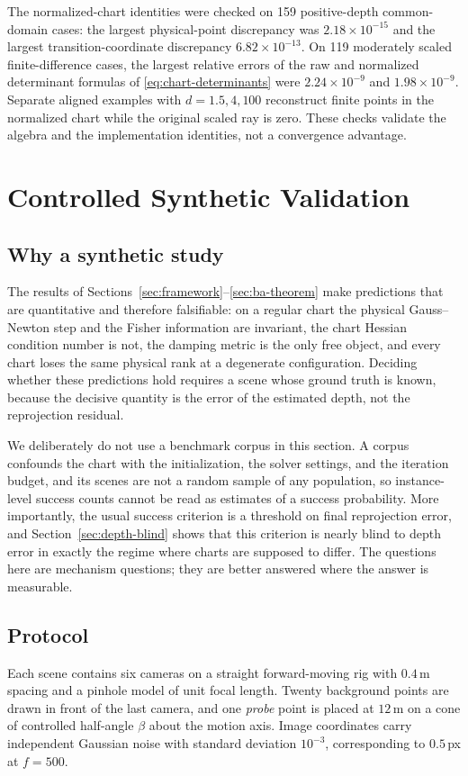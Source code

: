 \documentclass[11pt,a4paper]{article}
\theoremstyle{definition}
\theoremstyle{remark}
\begin{document}
The normalized-chart identities were checked on 159 positive-depth common-domain cases: the largest physical-point discrepancy was $2.18\times10^{-15}$ and the largest transition-coordinate discrepancy $6.82\times10^{-13}$. On 119 moderately scaled finite-difference cases, the largest relative errors of the raw and normalized determinant formulas of \eqref{eq:chart-determinants} were $2.24\times10^{-9}$ and $1.98\times10^{-9}$. Separate aligned examples with $d=1.5,4,100$ reconstruct finite points in the normalized chart while the original scaled ray is zero. These checks validate the algebra and the implementation identities, not a convergence advantage.

\section{Controlled Synthetic Validation}
\label{sec:synthetic}

\subsection{Why a synthetic study}
The results of Sections~\ref{sec:framework}--\ref{sec:ba-theorem} make predictions that are quantitative and therefore falsifiable: on a regular chart the physical Gauss--Newton step and the Fisher information are invariant, the chart Hessian condition number is not, the damping metric is the only free object, and every chart loses the same physical rank at a degenerate configuration. Deciding whether these predictions hold requires a scene whose ground truth is known, because the decisive quantity is the error of the estimated depth, not the reprojection residual.

We deliberately do not use a benchmark corpus in this section. A corpus confounds the chart with the initialization, the solver settings, and the iteration budget, and its scenes are not a random sample of any population, so instance-level success counts cannot be read as estimates of a success probability. More importantly, the usual success criterion is a threshold on final reprojection error, and Section~\ref{sec:depth-blind} shows that this criterion is nearly blind to depth error in exactly the regime where charts are supposed to differ. The questions here are mechanism questions; they are better answered where the answer is measurable.

\subsection{Protocol}
Each scene contains six cameras on a straight forward-moving rig with $0.4$\,m spacing and a pinhole model of unit focal length. Twenty background points are drawn in front of the last camera, and one \emph{probe} point is placed at $12$\,m on a cone of controlled half-angle $\beta$ about the motion axis. Image coordinates carry independent Gaussian noise with standard deviation $10^{-3}$, corresponding to $0.5$\,px at $f=500$.
\end{document}
